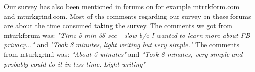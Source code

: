 Our survey has also been mentioned in forums on for example mturkform.com and mturkgrind.com. Most of the comments regarding our survey on these forums are about the time consumed taking the survey. The comments we got from mturkforum was: \textit{"Time 5 min 35 sec - slow b/c I wanted to learn more about FB privacy..."} and \textit{"Took 8 minutes, light writing but very simple."}
The comments from mturkgrind was: \textit{"About 5 minutes"} and \textit{"Took 8 minutes, very simple and probably could do it in less time. Light writing"}





